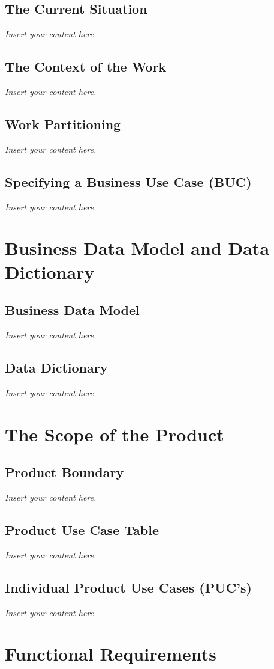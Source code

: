 \documentclass[12pt]{article}
\newcommand{\lips}{\textit{Insert your content here.}}
\begin{document}
\subsection{The Current Situation}
\lips
\subsection{The Context of the Work}
\lips
\subsection{Work Partitioning}
\lips
\subsection{Specifying a Business Use Case (BUC)}
\lips

\section{Business Data Model and Data Dictionary}
\subsection{Business Data Model}
\lips
\subsection{Data Dictionary}
\lips

\section{The Scope of the Product}
\subsection{Product Boundary}
\lips
\subsection{Product Use Case Table}
\lips
\subsection{Individual Product Use Cases (PUC's)}
\lips

\section{Functional Requirements}
\end{document}
